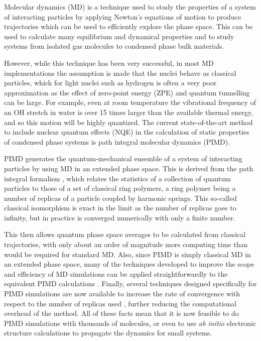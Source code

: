 \documentclass[11pt,english,fleqn]{report}
\begin{document}
Molecular dynamics (MD) is a technique used to study the properties
of a system of interacting particles by applying Newton's equations
of motion to produce trajectories which can be used to efficiently
explore the phase space. This can be used to calculate many equilibrium
and dynamical properties and to study systems from isolated gas molecules
to condensed phase bulk materials.

However, while this technique has been very successful, in most MD
implementations the assumption is made that the nuclei behave as classical
particles, which for light nuclei such as hydrogen is often a very
poor approximation as the effect of zero-point energy (ZPE) and quantum
tunnelling can be large. For example, even at room temperature the
vibrational frequency of an OH stretch in water is over 15 times larger
than the available thermal energy, and so this motion will be highly
quantized. The current state-of-the-art method to include nuclear
quantum effects (NQE) in the calculation of static properties of condensed
phase systems is path integral molecular dynamics (PIMD).

PIMD generates the quantum-mechanical ensemble of a system of interacting
particles by using MD in an extended phase space. This is derived
from the path integral formalism \cite{feyn-hibb65book}, which
relates the statistics of a collection of quantum particles to those
of a set of classical ring polymers, a ring polymer being a number
of replicas of a particle coupled by harmonic springs. This so-called
classical isomorphism is exact in the limit as the number of replicas
goes to infinity, but in practice is converged numerically with only
a finite number.

This then allows quantum phase space averages to be calculated from
classical trajectories, with only about an order of magnitude more
computing time than would be required for standard MD. Also, since
PIMD is simply classical MD in an extended phase space, many of the
techniques developed to improve the scope and efficiency of MD simulations
can be applied straightforwardly to the equivalent PIMD calculations
\cite{ceri+10jcp,mart+99jcp}. Finally, several techniques designed
specifically for PIMD simulations are now available to increase the
rate of convergence with respect to the number of replicas used
\cite{mark-mano08jcp,ceri+11jcp,suzu95pla,chin97pla,ceri+12prsa,pere-tuck11jcp},
further reducing the computational overhead of the method. All
of these facts mean that it is now feasible to do PIMD simulations
with thousands of molecules, or even to use \emph{ab initio} electronic
structure calculations to propagate the dynamics for small systems.
\end{document}
